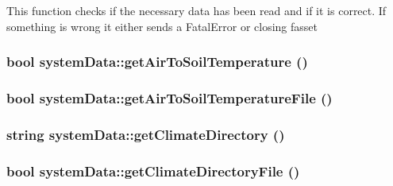 \label{classsystem_data_ad11a516464effcc5ef9a582534a3e351}
This function checks if the necessary data has been read and if it is correct. If something is wrong it either sends a FatalError or closing fasset \hypertarget{classsystem_data_a3d7d275e0efd7eeb40b2d68242076cc9}{
\subsubsection[{getAirToSoilTemperature}]{\setlength{\rightskip}{0pt plus 5cm}bool systemData::getAirToSoilTemperature ()}}
\label{classsystem_data_a3d7d275e0efd7eeb40b2d68242076cc9}
\hypertarget{classsystem_data_ae716c1a9cd60b6c662833c98882d9bf3}{
\subsubsection[{getAirToSoilTemperatureFile}]{\setlength{\rightskip}{0pt plus 5cm}bool systemData::getAirToSoilTemperatureFile ()}}
\label{classsystem_data_ae716c1a9cd60b6c662833c98882d9bf3}
\hypertarget{classsystem_data_a94cafcbc5d88c5b740220c486108b967}{
\subsubsection[{getClimateDirectory}]{\setlength{\rightskip}{0pt plus 5cm}string systemData::getClimateDirectory ()}}
\label{classsystem_data_a94cafcbc5d88c5b740220c486108b967}
\hypertarget{classsystem_data_a2d4ace1618c6d0b5f75aa1d9ae350f50}{
\subsubsection[{getClimateDirectoryFile}]{\setlength{\rightskip}{0pt plus 5cm}bool systemData::getClimateDirectoryFile ()}}
